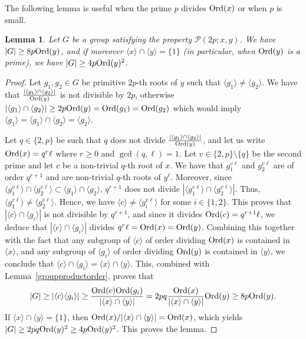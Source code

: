 \documentclass[12pt]{amsart}
\numberwithin{equation}{section}
\newcommand{\Ord}{{\rm Ord}}
\newtheorem{lem}[X]{Lemma}
\theoremstyle{definition}
\theoremstyle{remark}
\begin{document}
The following lemma is useful when the prime $p$ divides $\Ord(x)$ or when $p$ is small.
    \begin{lem}\label{lowerboundsmallp}
        Let $G$ be a group satisfying the property $\mathcal{P}(2p;x,y)$. We have $|G|\ge 8p\Ord(y)$, and if moreover $\langle x\rangle \cap\langle y\rangle=\{ 1\}$ (in particular, when $\Ord(y)$ is a prime), we have $|G|\ge 4p\Ord(y)^2$.
    \end{lem}
    \begin{proof}
        Let $g_1,g_2\in G$ be primitive $2p$-th roots of $y$ such that $\langle g_1\rangle\ne \langle g_2\rangle$. We have that $\frac{|\langle g_1\rangle \cap\langle g_2\rangle |}{\Ord(y)}$ is not divisible by $2p$, otherwise $|\langle g_1\rangle \cap\langle g_2\rangle |\ge 2p\Ord(y)=\Ord(g_1)=\Ord(g_2)$ which would imply $\langle g_1\rangle=\langle g_1\rangle \cap\langle g_2\rangle =\langle g_2\rangle$. 
        
        Let $q\in \{2,p\}$ be such that $q$ does not divide $\frac{|\langle g_1\rangle \cap\langle g_2\rangle |}{\Ord(y)}$, and let us write $\Ord(x)=q^r \ell$ where $r\ge 0$ and $\gcd(q,\ell)=1$. Let $v\in \{2,p\}\setminus\{q\}$ be the second prime and let $c$ be a non-trivial $q$-th root of $x$. We have that $g_1^{v\ell}$ and $g_2^{v\ell}$ are of order $q^{r+1}$ and are non-trivial $q$-th roots of $y^\ell$. Moreover, since $\langle g_1^{v\ell}\rangle\cap \langle g_2^{v\ell}\rangle \subset \langle g_1\rangle\cap \langle g_2\rangle$, $q^{r+1}$ does not divide $| \langle g_1^{v\ell}\rangle\cap \langle g_2^{v\ell}\rangle  |$. Thus, $\langle g_1^{v\ell}\rangle\ne \langle g_2^{v\ell}\rangle$. Hence, we have $\langle c\rangle \ne \langle g_i^{v\ell}\rangle$ for some $i\in \{1,2\}$. This proves that $|\langle c\rangle \cap \langle g_i\rangle|$ is not divisible by $q^{r+1}$, and since it divides $\Ord(c)=q^{r+1}\ell$, we deduce that $|\langle c\rangle \cap \langle g_i\rangle|$ divides $q^r\ell=\Ord(x)=\Ord(y)$. Combining this together with the fact that any subgroup of $\langle c\rangle $ of order dividing $\Ord(x)$ is contained in $\langle x\rangle$, and any subgroup of $\langle g_i\rangle$ of order dividing $\Ord(y)$ is contained in $\langle y\rangle$, we conclude that $\langle c\rangle \cap \langle g_i\rangle=\langle x\rangle \cap \langle y\rangle$. This, combined with Lemma~\ref{groupproductorder}, proves that \[|G|\ge|\langle c\rangle\langle g_i\rangle|\ge \frac{\Ord(c)\Ord(g_i)}{|\langle x\rangle\cap \langle y\rangle|}=2p q \frac{\Ord(x)}{|\langle x\rangle\cap \langle y\rangle|}\Ord(y)\ge 8p\Ord(y).\]
        If $\langle x\rangle \cap \langle y\rangle=\{1\}$, then $\Ord(x)/|\langle x\rangle\cap \langle y\rangle|=\Ord(x)$, which yields $|G|\ge 2pq \Ord(y)^2\ge 4p\Ord(y)^2$.
        This proves the lemma.


        
    \end{proof}
\end{document}
